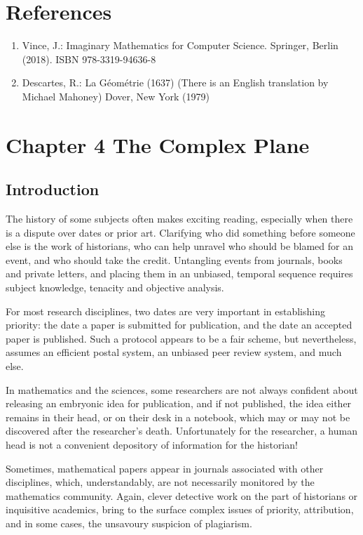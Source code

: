 \documentclass[10pt]{article}
\begin{document}
\section{References}
\begin{enumerate}
  \item Vince, J.: Imaginary Mathematics for Computer Science. Springer, Berlin (2018). ISBN 978-3319-94636-8

  \item Descartes, R.: La Géométrie (1637) (There is an English translation by Michael Mahoney) Dover, New York (1979)

\end{enumerate}

\section{Chapter 4
The Complex Plane}
\subsection{Introduction}
The history of some subjects often makes exciting reading, especially when there is a dispute over dates or prior art. Clarifying who did something before someone else is the work of historians, who can help unravel who should be blamed for an event, and who should take the credit. Untangling events from journals, books and private letters, and placing them in an unbiased, temporal sequence requires subject knowledge, tenacity and objective analysis.

For most research disciplines, two dates are very important in establishing priority: the date a paper is submitted for publication, and the date an accepted paper is published. Such a protocol appears to be a fair scheme, but nevertheless, assumes an efficient postal system, an unbiased peer review system, and much else.

In mathematics and the sciences, some researchers are not always confident about releasing an embryonic idea for publication, and if not published, the idea either remains in their head, or on their desk in a notebook, which may or may not be discovered after the researcher's death. Unfortunately for the researcher, a human head is not a convenient depository of information for the historian!

Sometimes, mathematical papers appear in journals associated with other disciplines, which, understandably, are not necessarily monitored by the mathematics community. Again, clever detective work on the part of historians or inquisitive academics, bring to the surface complex issues of priority, attribution, and in some cases, the unsavoury suspicion of plagiarism.
\end{document}
